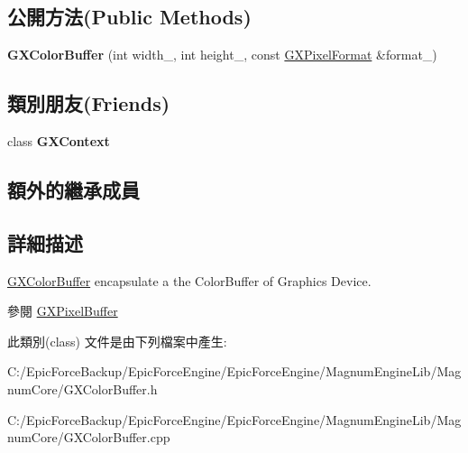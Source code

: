 \subsection*{公開方法(Public Methods)}
\begin{DoxyCompactItemize}
\item 
{\bfseries G\+X\+Color\+Buffer} (int width\+\_\+, int height\+\_\+, const \hyperlink{class_magnum_1_1_g_x_pixel_format}{G\+X\+Pixel\+Format} \&format\+\_\+)\hypertarget{class_magnum_1_1_g_x_color_buffer_ab2664f51f83c5ccb3d8404c907ee44c5}{}\label{class_magnum_1_1_g_x_color_buffer_ab2664f51f83c5ccb3d8404c907ee44c5}

\end{DoxyCompactItemize}
\subsection*{類別朋友(Friends)}
\begin{DoxyCompactItemize}
\item 
class {\bfseries G\+X\+Context}\hypertarget{class_magnum_1_1_g_x_color_buffer_a2c36d7f8865080802bbad88cd73d871c}{}\label{class_magnum_1_1_g_x_color_buffer_a2c36d7f8865080802bbad88cd73d871c}

\end{DoxyCompactItemize}
\subsection*{額外的繼承成員}


\subsection{詳細描述}
\hyperlink{class_magnum_1_1_g_x_color_buffer}{G\+X\+Color\+Buffer} encapsulate a the Color\+Buffer of Graphics Device. 

\begin{DoxySeeAlso}{參閱}
\hyperlink{class_magnum_1_1_g_x_pixel_buffer}{G\+X\+Pixel\+Buffer} 
\end{DoxySeeAlso}


此類別(class) 文件是由下列檔案中產生\+:\begin{DoxyCompactItemize}
\item 
C\+:/\+Epic\+Force\+Backup/\+Epic\+Force\+Engine/\+Epic\+Force\+Engine/\+Magnum\+Engine\+Lib/\+Magnum\+Core/G\+X\+Color\+Buffer.\+h\item 
C\+:/\+Epic\+Force\+Backup/\+Epic\+Force\+Engine/\+Epic\+Force\+Engine/\+Magnum\+Engine\+Lib/\+Magnum\+Core/G\+X\+Color\+Buffer.\+cpp\end{DoxyCompactItemize}
